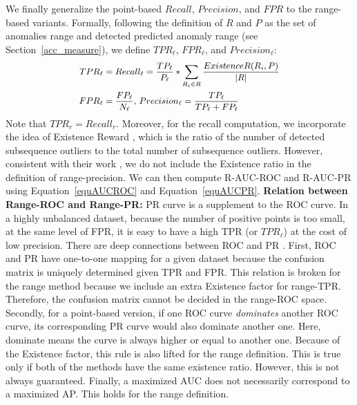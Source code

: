 We finally generalize the point-based $Recall$, $Precision$, and $FPR$ to the range-based variants. Formally, following the definition of $R$ and $P$ as the set of anomalies range and detected predicted anomaly range (see Section~\ref{acc_measure}), we define $TPR_{\ell}$, $FPR_{\ell}$, and $Precision_{\ell}$:
\begin{equation}
{\small
\begin{split}
TPR_\ell&=Recall_{\ell}=\frac{TP_{\ell}}{P_{\ell}}*\sum_{R_i \in R} \frac{ExistenceR(R_i,P)}{|R|} \\
FPR_{\ell}&=\frac{FP_{\ell}}{N_{\ell}} \text{, } Precision_{\ell}=\frac{TP_{\ell}}{TP_{\ell}+FP_{\ell}} \\
\end{split}
} %
\label{eqution_constant}
\end{equation}
\noindent Note that $TPR_r=Recall_r$. Moreover, for the recall computation, we incorporate the idea of Existence Reward \cite{tatbul_precision_2018}, which is the ratio of the number of detected subsequence outliers to the total number of subsequence outliers. However, consistent with their work \cite{tatbul_precision_2018}, we do not include the Existence ratio in the definition of range-precision. We can then compute R-AUC-ROC and R-AUC-PR using Equation~\ref{equAUCROC} and Equation~\ref{equAUCPR}.
\newline \textbf{Relation between Range-ROC and Range-PR: } PR curve is a supplement to the ROC curve. In a highly unbalanced dataset, because the number of positive points is too small, at the same level of FPR, it is easy to have a high TPR (or $TPR_{\ell}$) at the cost of low precision.  There are deep connections between ROC and PR \cite{10.1145/1143844.1143874}. First, ROC and PR have one-to-one mapping for a given dataset because the confusion matrix is uniquely determined given TPR and FPR. This relation is broken for the range method because we include an extra Existence factor for range-TPR. Therefore, the confusion matrix cannot be decided in the range-ROC space. Secondly, for a point-based version, if one ROC curve \textit{dominates} another ROC curve, its corresponding PR curve would also dominate another one. Here, dominate means the curve is always higher or equal to another one. Because of the Existence factor, this rule is also lifted for the range definition. This is true only if both of the methods have the same existence ratio. However, this is not always guaranteed. Finally, a maximized AUC does not necessarily correspond to a maximized AP. This holds for the range definition.

